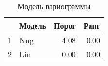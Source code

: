 \begin{table}[H]
\centering
\begin{tabular}{rlrr}
  \hline
 & Модель & Порог & Ранг \\ 
  \hline
1 & Nug & 4.08 & 0.00 \\ 
  2 & Lin & 0.00 & 0.00 \\ 
   \hline
\end{tabular}
\caption{Модель вариограммы} 
\label{table:manual_model}
\end{table}
